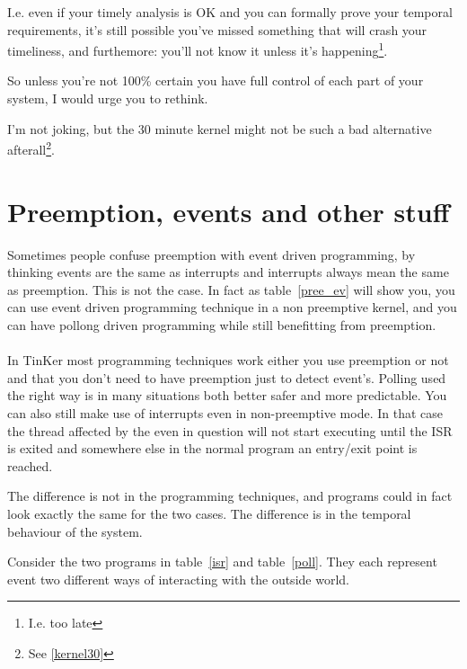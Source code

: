 I.e. even if your timely analysis is OK and you can formally prove your temporal requirements, it's still possible you've missed something that will crash your timeliness, and furthemore: you'll not know it unless it's happening\footnote{I.e. too late}.

So unless you're not 100\% certain you have full control of each part of your system, I would urge you to rethink.

I'm not joking, but the 30 minute kernel might not be such a bad alternative afterall\footnote{See \ref{kernel30}}.

\section{Preemption, events and other stuff}
 Sometimes people confuse preemption with event driven programming, by thinking events are the same as interrupts and interrupts always mean the same as preemption. This is not the case. In fact as table~\ref{pree_ev} will show you, you can use event driven programming technique in a non preemptive kernel, and you can have pollong driven programming while still benefitting from preemption. \\\\
In TinKer most programming techniques work either you use preemption or not and that you don't need to have preemption just to detect event's. Polling used the right way is in many situations both better safer and more predictable. You can also still make use of interrupts even in non-preemptive mode. In that case the thread affected by the even in question will not start executing until the ISR is exited and somewhere else in the normal program an entry/exit point is reached.

The difference is not in the programming techniques, and programs could in fact look exactly the same for the two cases. The difference is in the temporal behaviour of the system. 

Consider the two programs in table~\ref{isr} and table~\ref{poll}. They each represent event  two different ways of interacting with the outside world.

